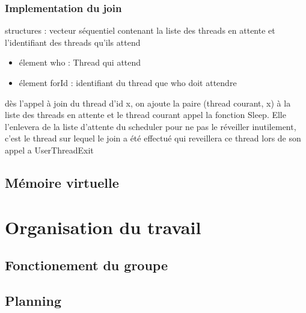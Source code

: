 \documentclass{article}
\begin{document}
		\subsubsection{Implementation du join}
			structures : vecteur séquentiel contenant la liste des threads en attente et l'identifiant des threads qu'ils attend
				\begin{itemize}
					\item élement who : Thread qui attend
					\item élement forId : identifiant du thread que who doit attendre
				\end{itemize}
			dès l'appel à join du thread d'id x, on ajoute la paire (thread courant, x) à la liste des threads en attente et le thread courant appel la fonction Sleep. Elle l'enlevera de la liste d'attente du scheduler pour ne pas le réveiller inutilement, c'est le thread sur lequel le join a été effectué qui reveillera ce thread lors de son appel a UserThreadExit

	\subsection{Mémoire virtuelle}
		\paragraph{}

\section{Organisation du travail}
	\subsection{Fonctionement du groupe}
	\subsection{Planning}
\end{document}
